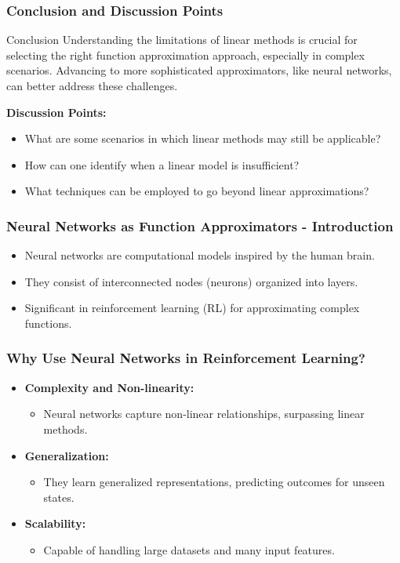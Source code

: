 \documentclass[aspectratio=169]{beamer}
\begin{document}
\begin{frame}[fragile]
    \frametitle{Conclusion and Discussion Points}
    \begin{block}{Conclusion}
        Understanding the limitations of linear methods is crucial for selecting the right function approximation approach, especially in complex scenarios. Advancing to more sophisticated approximators, like neural networks, can better address these challenges.
    \end{block}
    
    \vspace{10pt}
    
    \textbf{Discussion Points:}
    \begin{itemize}
        \item What are some scenarios in which linear methods may still be applicable?
        \item How can one identify when a linear model is insufficient?
        \item What techniques can be employed to go beyond linear approximations?
    \end{itemize}
\end{frame}

\begin{frame}[fragile]
    \frametitle{Neural Networks as Function Approximators - Introduction}
    \begin{itemize}
        \item Neural networks are computational models inspired by the human brain.
        \item They consist of interconnected nodes (neurons) organized into layers.
        \item Significant in reinforcement learning (RL) for approximating complex functions.
    \end{itemize}
\end{frame}

\begin{frame}[fragile]
    \frametitle{Why Use Neural Networks in Reinforcement Learning?}
    \begin{itemize}
        \item \textbf{Complexity and Non-linearity:} 
            \begin{itemize}
                \item Neural networks capture non-linear relationships, surpassing linear methods.
            \end{itemize}
        \item \textbf{Generalization:} 
            \begin{itemize}
                \item They learn generalized representations, predicting outcomes for unseen states.
            \end{itemize}
        \item \textbf{Scalability:} 
            \begin{itemize}
                \item Capable of handling large datasets and many input features.
            \end{itemize}
    \end{itemize}
\end{frame}
\end{document}
